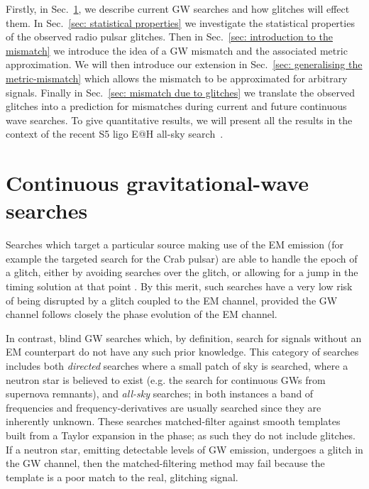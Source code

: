 \documentclass[../full_thesis/full_thesis.tex]{subfiles}
\begin{document}
Firstly, in Sec.~\ref{sec: continuous gravitational-wave searches}, we
describe current GW searches and how glitches will effect them.  In
Sec.~\ref{sec: statistical properties} we investigate the statistical
properties of the observed radio pulsar glitches.  Then in Sec.~\ref{sec:
introduction to the mismatch} we introduce the idea of a GW mismatch and the
associated metric approximation. We will then introduce our extension in Sec.~\ref{sec:
generalising the metric-mismatch} which allows the mismatch to be approximated
for arbitrary signals. Finally in Sec.~\ref{sec: mismatch due to glitches}
we translate the observed glitches into a prediction for mismatches during
current and future continuous wave searches.  To give quantitative results, we
will present all the results in the context of the recent S5 ligo E@H all-sky
search~\citet{ligo2013_EAH}.

\section{Continuous gravitational-wave searches}
\label{sec: continuous gravitational-wave searches}

Searches which target a particular source making use of the EM emission (for
example the \citet{ligo2010} targeted search for the Crab pulsar) are able to
handle the epoch of a glitch, either by avoiding searches over the glitch, or
allowing for a jump in the timing solution at that point \citep{ligo2010}. By
this merit, such searches have a very low risk of being disrupted by a glitch
coupled to the EM channel, provided the GW channel follows closely the phase
evolution of the EM channel.

In contrast, blind GW searches which, by definition, search for signals without an
EM counterpart do not have any such prior knowledge. This category of searches
includes both \emph{directed} searches where a small patch of sky is searched,
where a neutron star is believed to exist (e.g. the \citet{ligo_SNR2015} search
for continuous GWs from supernova remnants), and \emph{all-sky} searches; in
both instances a band of frequencies and frequency-derivatives are usually
searched since they are inherently unknown. These searches
matched-filter against smooth templates built from a Taylor expansion in
the phase; as such they do not include glitches. If a neutron star, emitting
detectable levels of GW emission, undergoes a glitch in the GW channel, then the
matched-filtering method may fail because the template is a poor match to the
real, glitching signal.
\end{document}
